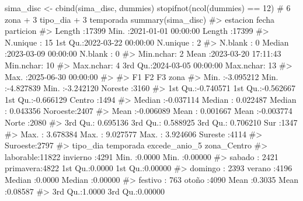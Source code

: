 \documentclass[
  spanish,
  letterpaper,
  DIV=11,
  numbers=noendperiod]{scrartcl}
\newenvironment{Shaded}{\begin{snugshade}}{\end{snugshade}}
\newcommand{\CommentTok}[1]{\textcolor[rgb]{0.37,0.37,0.37}{#1}}
\newcommand{\DecValTok}[1]{\textcolor[rgb]{0.68,0.00,0.00}{#1}}
\newcommand{\FunctionTok}[1]{\textcolor[rgb]{0.28,0.35,0.67}{#1}}
\newcommand{\NormalTok}[1]{\textcolor[rgb]{0.00,0.23,0.31}{#1}}
\newcommand{\OtherTok}[1]{\textcolor[rgb]{0.00,0.23,0.31}{#1}}
\newcommand{\SpecialCharTok}[1]{\textcolor[rgb]{0.37,0.37,0.37}{#1}}
\begin{document}
\begin{Shaded}
\begin{Highlighting}[]
\NormalTok{sima\_disc }\OtherTok{\textless{}{-}} \FunctionTok{cbind}\NormalTok{(sima\_disc, dummies)}
\FunctionTok{stopifnot}\NormalTok{(}\FunctionTok{ncol}\NormalTok{(dummies) }\SpecialCharTok{==} \DecValTok{12}\NormalTok{) }\CommentTok{\# 6 zona + 3 tipo\_dia + 3 temporada}
\FunctionTok{summary}\NormalTok{(sima\_disc)}
\CommentTok{\#\textgreater{}       estacion         fecha                         particion    }
\CommentTok{\#\textgreater{}  Length   :17399   Min.   :2021{-}01{-}01 00:00:00   Length   :17399  }
\CommentTok{\#\textgreater{}  N.unique :   15   1st Qu.:2022{-}03{-}22 00:00:00   N.unique :    2  }
\CommentTok{\#\textgreater{}  N.blank  :    0   Median :2023{-}03{-}09 00:00:00   N.blank  :    0  }
\CommentTok{\#\textgreater{}  Min.nchar:    2   Mean   :2023{-}03{-}20 17:11:43   Min.nchar:   10  }
\CommentTok{\#\textgreater{}  Max.nchar:    4   3rd Qu.:2024{-}03{-}05 00:00:00   Max.nchar:   13  }
\CommentTok{\#\textgreater{}                    Max.   :2025{-}06{-}30 00:00:00                    }
\CommentTok{\#\textgreater{}                                                                   }
\CommentTok{\#\textgreater{}        F1                  F2                  F3                  zona     }
\CommentTok{\#\textgreater{}  Min.   :{-}3.095212   Min.   :{-}4.827839   Min.   :{-}3.242120   Noreste :3160  }
\CommentTok{\#\textgreater{}  1st Qu.:{-}0.740571   1st Qu.:{-}0.562667   1st Qu.:{-}0.666129   Centro  :1494  }
\CommentTok{\#\textgreater{}  Median :{-}0.037114   Median : 0.022487   Median : 0.043356   Noroeste:2407  }
\CommentTok{\#\textgreater{}  Mean   :{-}0.006089   Mean   : 0.001667   Mean   :{-}0.003774   Norte   :2080  }
\CommentTok{\#\textgreater{}  3rd Qu.: 0.695136   3rd Qu.: 0.588925   3rd Qu.: 0.706210   Sur     :1347  }
\CommentTok{\#\textgreater{}  Max.   : 3.678384   Max.   : 9.027577   Max.   : 3.924606   Sureste :4114  }
\CommentTok{\#\textgreater{}                                                              Suroeste:2797  }
\CommentTok{\#\textgreater{}       tipo\_dia         temporada    excede\_anio\_5     zona\_Centro     }
\CommentTok{\#\textgreater{}  laborable:11822   invierno :4291   Min.   :0.0000   Min.   :0.00000  }
\CommentTok{\#\textgreater{}  sabado   : 2421   primavera:4822   1st Qu.:0.0000   1st Qu.:0.00000  }
\CommentTok{\#\textgreater{}  domingo  : 2393   verano   :4196   Median :0.0000   Median :0.00000  }
\CommentTok{\#\textgreater{}  festivo  :  763   otoño    :4090   Mean   :0.3035   Mean   :0.08587  }
\CommentTok{\#\textgreater{}                                     3rd Qu.:1.0000   3rd Qu.:0.00000  }

\end{Highlighting}
\end{Shaded}
\end{document}
